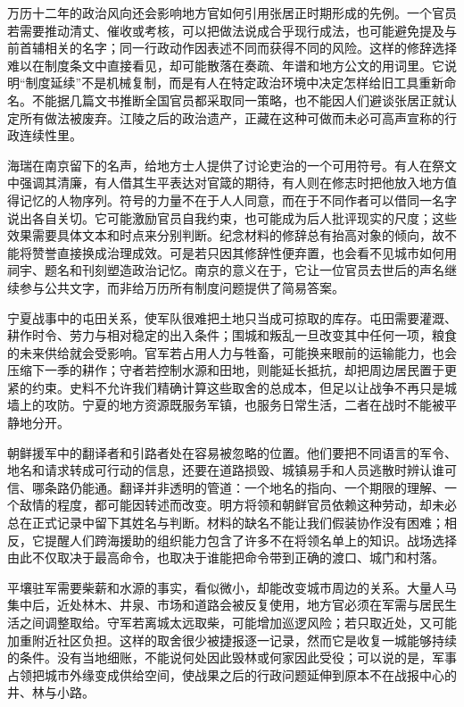 万历十二年的政治风向还会影响地方官如何引用张居正时期形成的先例。一个官员若需要推动清丈、催收或考核，可以把做法说成合乎现行成法，也可能避免提及与前首辅相关的名字；同一行政动作因表述不同而获得不同的风险。这样的修辞选择难以在制度条文中直接看见，却可能散落在奏疏、年谱和地方公文的用词里。它说明“制度延续”不是机械复制，而是有人在特定政治环境中决定怎样给旧工具重新命名。不能据几篇文书推断全国官员都采取同一策略，也不能因人们避谈张居正就认定所有做法被废弃。江陵之后的政治遗产，正藏在这种可做而未必可高声宣称的行政连续性里。

海瑞在南京留下的名声，给地方士人提供了讨论吏治的一个可用符号。有人在祭文中强调其清廉，有人借其生平表达对官箴的期待，有人则在修志时把他放入地方值得记忆的人物序列。符号的力量不在于人人同意，而在于不同作者可以借同一名字说出各自关切。它可能激励官员自我约束，也可能成为后人批评现实的尺度；这些效果需要具体文本和时点来分别判断。纪念材料的修辞总有抬高对象的倾向，故不能将赞誉直接换成治理成效。可是若只因其修辞性便弃置，也会看不见城市如何用祠宇、题名和刊刻塑造政治记忆。南京的意义在于，它让一位官员去世后的声名继续参与公共文字，而非给万历所有制度问题提供了简易答案。

宁夏战事中的屯田关系，使军队很难把土地只当成可掠取的库存。屯田需要灌溉、耕作时令、劳力与相对稳定的出入条件；围城和叛乱一旦改变其中任何一项，粮食的未来供给就会受影响。官军若占用人力与牲畜，可能换来眼前的运输能力，也会压缩下一季的耕作；守者若控制水源和田地，则能延长抵抗，却把周边居民置于更紧的约束。史料不允许我们精确计算这些取舍的总成本，但足以让战争不再只是城墙上的攻防。宁夏的地方资源既服务军镇，也服务日常生活，二者在战时不能被平静地分开。

朝鲜援军中的翻译者和引路者处在容易被忽略的位置。他们要把不同语言的军令、地名和请求转成可行动的信息，还要在道路损毁、城镇易手和人员逃散时辨认谁可信、哪条路仍能通。翻译并非透明的管道：一个地名的指向、一个期限的理解、一个敌情的程度，都可能因转述而改变。明方将领和朝鲜官员依赖这种劳动，却未必总在正式记录中留下其姓名与判断。材料的缺名不能让我们假装协作没有困难；相反，它提醒人们跨海援助的组织能力包含了许多不在将领名单上的知识。战场选择由此不仅取决于最高命令，也取决于谁能把命令带到正确的渡口、城门和村落。

平壤驻军需要柴薪和水源的事实，看似微小，却能改变城市周边的关系。大量人马集中后，近处林木、井泉、市场和道路会被反复使用，地方官必须在军需与居民生活之间调整取给。守军若离城太远取柴，可能增加巡逻风险；若只取近处，又可能加重附近社区负担。这样的取舍很少被捷报逐一记录，然而它是收复一城能够持续的条件。没有当地细账，不能说何处因此毁林或何家因此受役；可以说的是，军事占领把城市外缘变成供给空间，使战果之后的行政问题延伸到原本不在战报中心的井、林与小路。

